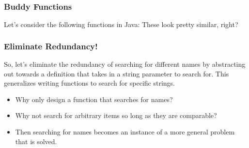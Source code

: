 \documentclass{beamer}
\begin{document}

\begin{frame}
  \frametitle{Buddy Functions}
  Let's consider the following functions in Java:
  \buddies
  \pause
  These look pretty similar, right?
\end{frame}


\begin{frame}
  \frametitle{Eliminate Redundancy!}
  So, let's eliminate the redundancy of searching
  for different names by abstracting out towards
  a definition that takes in a string parameter
  to search for. This generalizes writing functions
  to search for specific strings.

  \abstractOne
  \begin{itemize}
  \item<2-> Why only design a function that searches for names?
  \item<3-> Why not search for arbitrary items so long as they
    are comparable?
  \item<4-> Then searching for names becomes an instance of a
    more general problem that is solved.    
  \end{itemize}
\end{frame}

\end{document}
